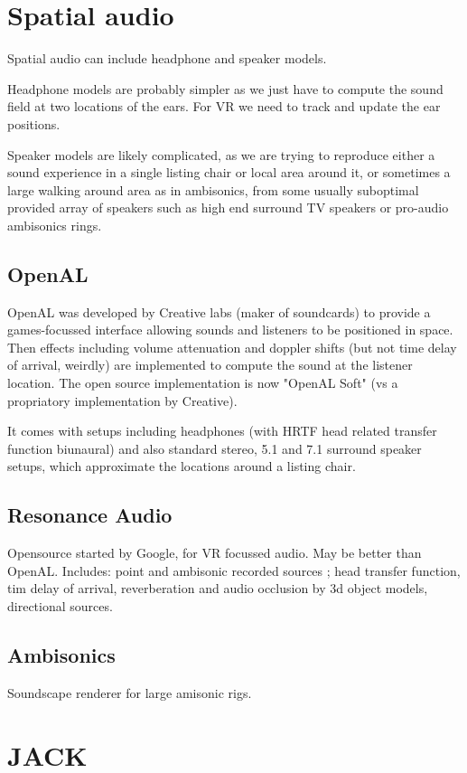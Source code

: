 \documentclass[oneside,english]{scrbook}
\begin{document}
\chapter{Spatial audio}

Spatial audio can include headphone and speaker models.   

Headphone models are probably simpler as we just have to compute the sound field at two locations of the ears.  For VR we need to track and update the ear positions. 

Speaker models are likely complicated, as we are trying to reproduce either a sound experience in a single listing chair or local area around it, or sometimes a large walking around area as in ambisonics, from some usually suboptimal provided array of speakers such as high end surround TV speakers or pro-audio ambisonics rings.

\section{OpenAL}
OpenAL was developed by Creative labs (maker of soundcards) to provide a games-focussed interface allowing sounds and listeners to be positioned in space.  Then effects including volume attenuation and doppler shifts (but not time delay of arrival, weirdly) are implemented to compute the sound at the listener location.  The open source implementation is now "OpenAL Soft" (vs a propriatory implementation by Creative).

It comes with setups including headphones (with HRTF head related transfer function biunaural) and also standard stereo, 5.1 and 7.1 surround speaker setups, which approximate the locations around a listing chair.

\section{Resonance Audio}
Opensource started by Google, for VR focussed audio.  May be better than OpenAL. Includes:   point and ambisonic recorded sources ; head transfer function, tim delay of arrival, reverberation and audio occlusion by 3d object models, directional sources.

\section{Ambisonics}
Soundscape renderer for large amisonic rigs.


\chapter{JACK}
\end{document}
